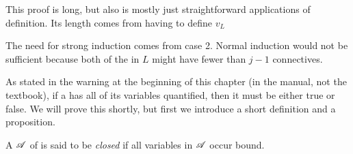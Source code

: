 \begin{proposition}
  \note{} This proof is long, but also is mostly just straightforward applications of definition. Its length comes from having to define \(v_L\) 

  \note{} The need for strong induction comes from case 2. Normal induction would not be sufficient because both of the \wfs{} in \(L\) might have fewer than \(j - 1\) connectives.
\end{proposition}

As stated in the warning at the beginning of this chapter (in the manual, not the textbook), if a \wf{} has all of its variables quantified, then it must be either true or false. We will prove this shortly, but first we introduce a short definition and a proposition.

\begin{definition}
  A \wf{} \(\mathscr{A}\) of \cl{} is said to be \textit{closed} if all variables in \(\mathscr{A}\) occur bound.
\end{definition}

